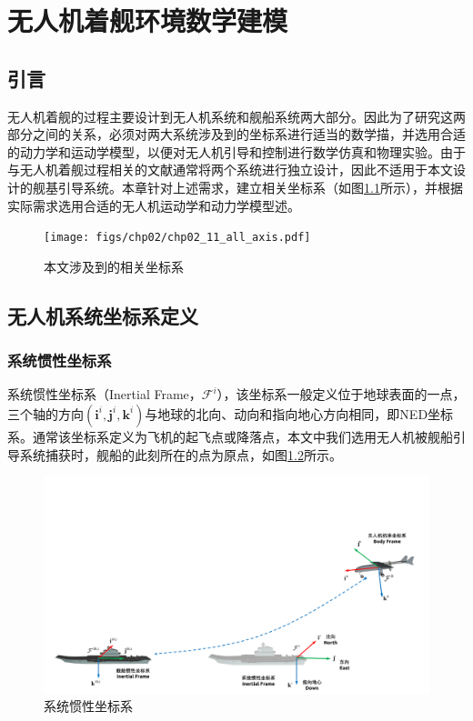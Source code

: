 \chapter{无人机着舰环境数学建模}
\section{引言}
无人机着舰的过程主要设计到无人机系统和舰船系统两大部分。因此为了研究这两部分之间的关系，必须对两大系统涉及到的坐标系进行适当的数学描，并选用合适的动力学和运动学模型，以便对无人机引导和控制进行数学仿真和物理实验。由于与无人机着舰过程相关的文献通常将两个系统进行独立设计，因此不适用于本文设计的舰基引导系统。本章针对上述需求，建立相关坐标系（如图\ref{fig:chp02_11_all_axis}所示），并根据实际需求选用合适的无人机运动学和动力学模型述\cite{beardsmall}。
\begin{figure}[htb]   
	\centering
	\texttt{[image: figs/chp02/chp02\_11\_all\_axis.pdf]}
	\caption{本文涉及到的相关坐标系}
	\label{fig:chp02_11_all_axis}
\end{figure}

\section{无人机系统坐标系定义}


\subsection{系统惯性坐标系}
系统惯性坐标系（Inertial Frame，$\mathcal{F}^i$），该坐标系一般定义位于地球表面的一点，三个轴的方向$(\mathbf{i}^i, \mathbf{j}^i,\mathbf{k}^i)$与地球的北向、动向和指向地心方向相同，即NED坐标系。通常该坐标系定义为飞机的起飞点或降落点，本文中我们选用无人机被舰船引导系统捕获时，舰船的此刻所在的点为原点，如图\ref{fig:chp02_01_sys_interial_frame}所示。
\begin{figure}[htb]   
	\centering
	\includegraphics[width=\textwidth]{figs/chp02/chp02_01_sys_interial_frame.pdf}
	\caption{系统惯性坐标系}
	\label{fig:chp02_01_sys_interial_frame}
\end{figure}

